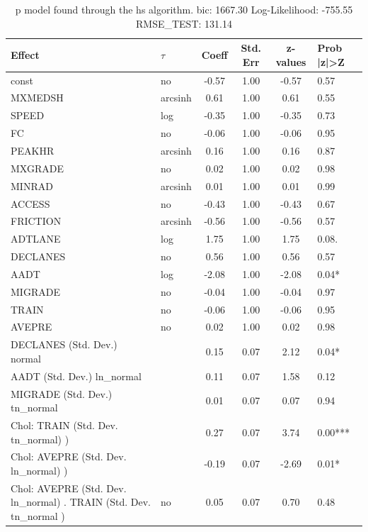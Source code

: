 \begin{table}
	\caption{p model found through the hs algorithm. bic: 1667.30 Log-Likelihood: -755.55 RMSE_TEST: 131.14}
	\begin{center}
		\begin{tabular}{|l|l|c|c|c|l|}
			\hline
			Effect & $\tau$ & Coeff & Std. Err & z-values & Prob |z|>Z \\
			\hline
			const & no & -0.57 & 1.00 & -0.57 & 0.57 \\
			\hline
			MXMEDSH & arcsinh & 0.61 & 1.00 & 0.61 & 0.55 \\
			\hline
			SPEED & log & -0.35 & 1.00 & -0.35 & 0.73 \\
			\hline
			FC & no & -0.06 & 1.00 & -0.06 & 0.95 \\
			\hline
			PEAKHR & arcsinh & 0.16 & 1.00 & 0.16 & 0.87 \\
			\hline
			MXGRADE & no & 0.02 & 1.00 & 0.02 & 0.98 \\
			\hline
			MINRAD & arcsinh & 0.01 & 1.00 & 0.01 & 0.99 \\
			\hline
			ACCESS & no & -0.43 & 1.00 & -0.43 & 0.67 \\
			\hline
			FRICTION & arcsinh & -0.56 & 1.00 & -0.56 & 0.57 \\
			\hline
			ADTLANE & log & 1.75 & 1.00 & 1.75 & 0.08. \\
			\hline
			DECLANES & no & 0.56 & 1.00 & 0.56 & 0.57 \\
			\hline
			AADT & log & -2.08 & 1.00 & -2.08 & 0.04* \\
			\hline
			MIGRADE & no & -0.04 & 1.00 & -0.04 & 0.97 \\
			\hline
			TRAIN & no & -0.06 & 1.00 & -0.06 & 0.95 \\
			\hline
			AVEPRE & no & 0.02 & 1.00 & 0.02 & 0.98 \\
			\hline
			DECLANES (Std. Dev.) normal &  & 0.15 & 0.07 & 2.12 & 0.04* \\
			\hline
			AADT (Std. Dev.) ln_normal &  & 0.11 & 0.07 & 1.58 & 0.12 \\
			\hline
			MIGRADE (Std. Dev.) tn_normal &  & 0.01 & 0.07 & 0.07 & 0.94 \\
			\hline
			 Chol: TRAIN (Std. Dev. tn_normal) ) &  & 0.27 & 0.07 & 3.74 & 0.00*** \\
			\hline
			 Chol: AVEPRE (Std. Dev. ln_normal) ) &  & -0.19 & 0.07 & -2.69 & 0.01* \\
			\hline
			 Chol: AVEPRE (Std. Dev. ln_normal) . TRAIN (Std. Dev.   tn_normal ) & no & 0.05 & 0.07 & 0.70 & 0.48 \\

\end{tabular}
\end{center}
\end{table}

